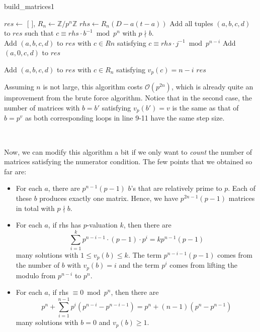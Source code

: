 \documentclass[letterpaper,12pt]{article}
\newcommand{\Z}{\mathbb{Z}}
\newcommand{\bigO}{\mathcal{O}}
\begin{document}
\begin{algorithm}[H]
\caption{build\_matrices1}
\begin{algorithmic}[1]
    \State $res \gets$ [ ], $R_n \gets \Z/p^n\Z$    
        \State $rhs \gets R_n(D - a(t-a))$
        \State Add all tuples $(a,b,c,d)$ to $res$ such that $c \equiv rhs \cdot b^{-1} \bmod p^n$ with $p \nmid b$. \\
        
                    \State Add $(a,b,c,d)$ to $res$ with $c \in Rn$ satisfying $c \equiv rhs \cdot j^{-1} \bmod p^{n-i}$
                \EndFor
            \EndFor
        \Else
                \State Add $(a,0,c,d)$ to $res$
            \EndFor

                \State Add $(a,b,c,d)$ to $res$ with $c \in R_n$ satisfying $v_p(c) = n-i$
            \EndFor
        \EndIf
    \EndFor
    \State \Return $res$
\EndFunction
\end{algorithmic}
\end{algorithm}

Assuming $n$ is not large, this algorithm costs $\bigO(p^{2n})$,
which is already quite an improvement from the brute force algorithm.
Notice that in the second case, the number of matrices 
with $b = b'$ satisfying $v_p(b') = v$ is the same as that of $b = p^v$
as both corresponding loops in line 9-11 have the same step size.

\

Now, we can modify this algorithm a bit if we only want to \emph{count} the number of matrices
satisfying the numerator condition.
The few points that we obtained so far are:
\begin{itemize}
\item For each $a$, there are $p^{n-1}(p-1)$ $b$'s that are relatively prime to $p$.
Each of these $b$ produces exactly one matrix.
Hence, we have $p^{2n-1}(p-1)$ matrices in total with $p \nmid b$.
\item For each $a$, if rhs has $p$-valuation $k$, then there are 
\[
\sum_{i=1}^k p^{n-i-1} \cdot (p-1) \cdot p^i = k p^{n-1}(p-1)
\]
many solutions with $1 \leq v_p(b) \leq k$.
The term $p^{n-i-1}(p-1)$ comes from the number of $b$
with $v_p(b) = i$
and the term $p^i$ comes from lifting the modulo from $p^{n-i}$ to $p^n$.
\item For each $a$, if rhs $\equiv 0 \bmod p^n$, then there are 
\[
p^n + \sum_{i=1}^{n-1} p^i (p^{n-i} - p^{n-i-1})
= p^n + (n-1) (p^n - p^{n-1})
\]
many solutions with $b = 0$ and $v_p(b) \geq 1$.
\end{itemize}
\end{document}
